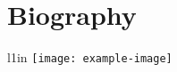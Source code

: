 \chapter{Biography}\label{App:Biography}

\begin{wrapfigure}{l}{1in}
	\texttt{[image: example-image]}
\end{wrapfigure}

\par
\textbf{\InsertStudentName} \color{gray}\lipsum[1-1]
\par